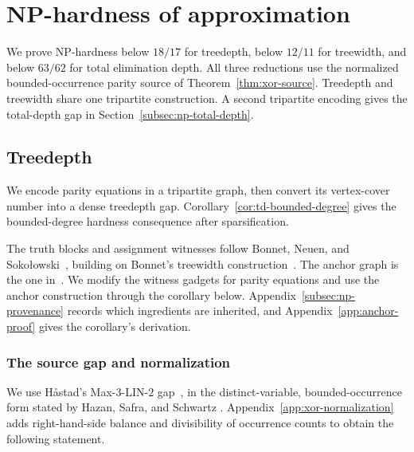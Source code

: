 \section{NP-hardness of approximation}
\label{sec:np-hardness}

We prove NP-hardness below $18/17$ for treedepth, below $12/11$
for treewidth, and below $63/62$ for total elimination depth.
All three reductions use the normalized bounded-occurrence parity source
of Theorem~\ref{thm:xor-source}. Treedepth and treewidth share one
tripartite construction. A second tripartite encoding gives the
total-depth gap in Section~\ref{subsec:np-total-depth}.

\subsection{Treedepth}
\label{subsec:np-treedepth}

We encode parity equations in a tripartite graph, then convert its
vertex-cover number into a dense treedepth gap.
Corollary~\ref{cor:td-bounded-degree} gives the bounded-degree
hardness consequence after sparsification.

The truth blocks and assignment witnesses follow Bonnet, Neuen, and
Soko\l owski~\cite[Section~4 and Lemma~10]{BNS}, building on Bonnet's
treewidth construction~\cite[Section~3.1]{BonnetTreewidth}. The anchor graph
is the one in~\cite[Lemma~6]{BNS}. We modify the witness gadgets
for parity equations and use the anchor construction through the
corollary below. Appendix~\ref{subsec:np-provenance} records which
ingredients are inherited, and Appendix~\ref{app:anchor-proof} gives
the corollary's derivation.

\subsubsection{The source gap and normalization}

We use H{\aa}stad's Max-3-LIN-$2$
gap~\cite{Hastad1997}, in the distinct-variable,
bounded-occurrence form stated by Hazan, Safra, and Schwartz
\cite[Theorem~10]{HazanSafraSchwartz2003}.
Appendix~\ref{app:xor-normalization} adds right-hand-side balance and
divisibility of occurrence counts to obtain the following statement.

